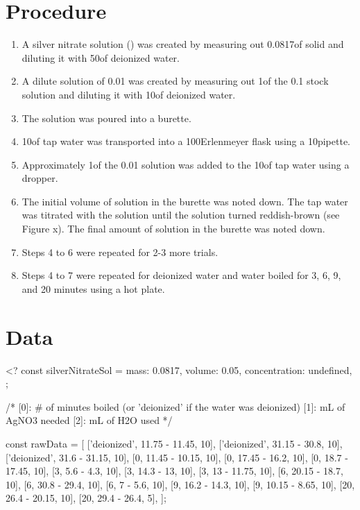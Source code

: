 \documentclass[11pt]{article}
\begin{document}
\section{Procedure}

\begin{enumerate}
	\item A silver nitrate solution () was created by measuring out 0.0817\g of solid  and diluting it with 50\ml of deionized water.
	\item A dilute solution of 0.01\mpl {} was created by measuring out 1\ml of the 0.1\mpl {} stock solution and diluting it with 10\ml of deionized water.
	\item The  solution was poured into a burette.
	\item 10\ml of tap water was transported into a 100\ml Erlenmeyer flask using a 10\ml pipette.
	\item Approximately 1\ml of the 0.01\mpl {} solution was added to the 10\ml of tap water using a dropper.
	\item The initial volume of  solution in the burette was noted down. The tap water was titrated with the  solution until the solution turned reddish-brown (see Figure x). The final amount of solution in the burette was noted down.
	\item Steps 4 to 6 were repeated for 2-3 more trials.
	\item Steps 4 to 7 were repeated for deionized water and water boiled for 3, 6, 9, and 20 minutes using a hot plate.
\end{enumerate}

\section{Data}

<?
const silverNitrateSol = {
	mass: 0.0817,
	volume: 0.05,
	concentration: undefined,
};

/*
[0]: # of minutes boiled (or 'deionized' if the water was deionized)
[1]: mL of AgNO3 needed
[2]: mL of H2O used
*/

const rawData = [
	['deionized', 11.75 - 11.45, 10],
	['deionized', 31.15 - 30.8, 10],
	['deionized', 31.6 - 31.15, 10],
	[0, 11.45 - 10.15, 10],
	[0, 17.45 - 16.2, 10],
	[0, 18.7 - 17.45, 10],
	[3, 5.6 - 4.3, 10],
	[3, 14.3 - 13, 10],
	[3, 13 - 11.75, 10],
	[6, 20.15 - 18.7, 10],
	[6, 30.8 - 29.4, 10],
	[6, 7 - 5.6, 10],
	[9, 16.2 - 14.3, 10],
	[9, 10.15 - 8.65, 10],
	[20, 26.4 - 20.15, 10],
	[20, 29.4 - 26.4, 5],
];
\end{document}
